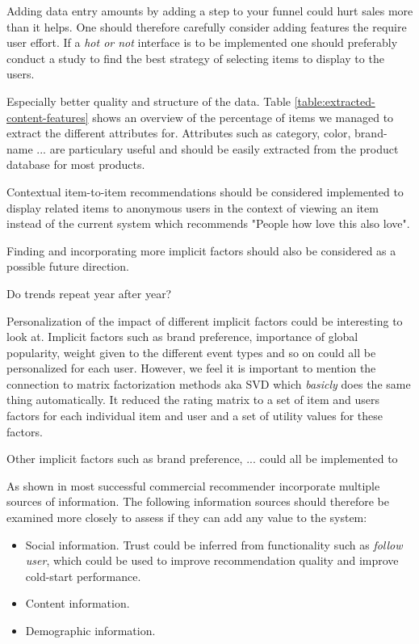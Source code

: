 Adding data entry amounts by adding a step to your funnel could hurt sales more than it helps. One should
therefore carefully consider adding features the require user effort. If a \emph{hot or not} interface is to be implemented
one should preferably conduct a study to find the best strategy of selecting items to display to the users.

Especially better quality and structure of the data. Table \ref{table:extracted-content-features} shows an overview of
the percentage of items we managed to extract the different attributes for. Attributes such as category, color, brand-name ...
are particulary useful and should be easily extracted from the product database for most products.


Contextual item-to-item recommendations should be considered implemented to display related
items to anonymous users in the context of viewing an item instead of the current system which
recommends "People how love this also love".




Finding and incorporating more implicit factors should also be considered as a possible future direction.

Do trends repeat year after year?

Personalization of the impact of different implicit factors could be interesting to look at.
Implicit factors such as brand preference, importance of global popularity, weight given
to the different event types and so on could all be personalized for each user.
However, we feel it is important to mention the connection to matrix factorization methods
aka SVD which \emph{basicly} does the same thing automatically. It reduced the rating matrix
to a set of item and users factors for each individual item and user and a set of utility values
for these factors.


Other implicit factors such as brand preference, ... could all be implemented to



As shown in \cite{FranceTelecom} most successful commercial recommender incorporate multiple
sources of information. The following information sources should therefore be examined more
closely to assess if they can add any value to the system:

\begin{itemize}
\item Social information. Trust could be inferred from functionality such as \emph{follow user}, which
	  could be used to improve recommendation quality and improve cold-start performance.
\item Content information.
\item Demographic information.
\end{itemize}

